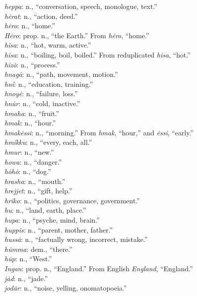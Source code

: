\documentclass{article}[10pt]
\begin{document}
\begin{multicols}{3}
\emph{heppa}: n., ``conversation, speech, monologue, text.''\\
\emph{h\.{e}rat}: n., ``action, deed.''\\
\emph{h\.{e}ro}: n., ``home.''\\
\emph{H\.{e}ro}: prop. n., ``the Earth.'' From \emph{h\.{e}ro}, ``home.''\\
\emph{hisa}: n., ``hot, warm, active.''\\
\emph{hisa}: n., ``boiling, boil, boiled.'' From reduplicated \emph{hisa}, ``hot.''\\
\emph{hiz\.{o}}: n., ``process.''\\
\emph{hnag\.{a}}: n., ``path, movement, motion.''\\
\emph{hn\'{i}}: n., ``education, training.''\\
\emph{hnoy\.{e}}: n., ``failure, loss.''\\
\emph{hn\.{u}r}: n., ``cold, inactive.''\\
\emph{hmaha}: n., ``fruit.''\\
\emph{hmak}: n., ``hour.''\\
\emph{hmak\.{e}ssi}: n., ``morning.'' From \emph{hmak}, ``hour,'' and \emph{\.{e}ssi}, ``early.''\\
\emph{hm\'{i}kku}: n., ``every, each, all.''\\
\emph{hmur}: n., ``new.''\\
\emph{howa}: n., ``danger.''\\
\emph{h\.{o}h\.{o}}: n., ``dog.''\\
\emph{hrasha}: n., ``mouth.''\\
\emph{hrejjet}: n., ``gift, help.''\\
\emph{hriko}: n., ``politics, governance, government.''\\
\emph{hu}: n., ``land, earth, place.''\\
\emph{hupa}: n., ``psyche, mind, brain.''\\
\emph{huppis}: n., ``parent, mother, father.''\\
\emph{huss\.{a}}: n., ``factually wrong, incorrect, mistake.''\\
\emph{h\.{u}mma}: dem., ``there.''\\
\emph{h\.{u}p}: n., ``West.''\\
\emph{Ingan}: prop. n., ``England.'' From English \emph{England}, ``England.''\\
\emph{j\.{a}d}: n., ``jade.''\\
\emph{jod\.{a}r}: n., ``noise, yelling, onomatopoeia.''\\

\end{multicols}
\end{document}
